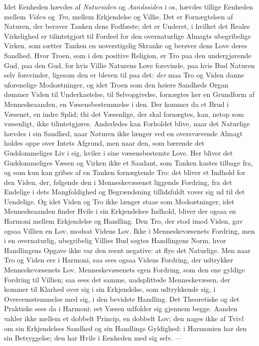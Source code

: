 \documentclass[12pt,a4paper,openany]{book}
\newcommand{\opage}[1]{\marginnote{\footnotesize\textit{[#1]}}}
\begin{document}
Idet Eenheden hævdes af \emph{Natursiden} og \emph{Aandssiden}
i os, hævdes tillige Eenheden mellem \emph{Viden} og \emph{Tro},
mellem Erkjendelse og Villie. Det er Fornægtelsen af Naturen,
der berøver Tanken dens Fodfæste; det er Underet, i hvilket
det Reales Virkelighed er tilintetgjort til Fordeel for den
overnaturlige Almagts ubegribelige Virken, som sætter Tanken
en uoverstigelig Skranke og berøver dens Love deres Sandhed.
Hvor Troen, som i den positive Religion, er Tro paa den
undergjørende Gud, paa den Gud, for hvis Villie Naturens
Love forsvinde, paa hvis Bud Naturen selv forsvinder, ligesom
den er bleven til paa det: \emph{der} maa Tro og Viden danne
uforenelige Modsætninger, og idet Troen som den høiere
Sandheds Organ dømmer Viden til Underkastelse, til Selvopgivelse,
fornægtes her en Grundform af Menneskeaanden,
en Væsensbestemmelse i den. Der kommer da et Brud i
Væsenet, en indre Splid; thi det Væsenlige, der skal fornægtes,
kan, netop som væsenligt, ikke tilintetgjøres. Anderledes
kan Forholdet blive, naar det Naturlige hævdes i sin
Sandhed, naar Naturen ikke længer ved en oversvævende
Almagt holdes oppe over Intets Afgrund, men naar den,
\opage{495}som bærende det Guddommeliges Liv i sig, hviler i sine
væsensbestemte Love. Her bliver det Guddommeliges Væsen
og Virken ikke et Saadant, som Tanken kastes tilbage fra,
og som kun kan gribes af en Tanken fornægtende Tro: det
bliver et Indhold for den Viden, der, følgende den i Menneskevæsenet
liggende Fordring, fra det Endelige i dets Mangfoldighed
og Begrændsning tillidsfuldt vover sig ud til det
Uendelige. Og idet Viden og Tro ikke længer staae som
Modsætninger, idet Menneskeaanden finder Hvile i sin Erkjendelses
Indhold, bliver der ogsaa en Harmoni mellem Erkjendelse
og Handling. Den Tro, der stod imod Viden, gav
ogsaa Villien en Lov, modsat Videns Lov. Ikke i Menneskevæsenets
Fordring, men i en overnaturlig, ubegribelig Villies
Bud søgtes Handlingens Norm, hvor Handlingens Opgave
ikke var den reent negative: at flye det Naturlige. Men naar
Tro og Viden ere i Harmoni, saa sees ogsaa Videns Fordring,
der udtrykker Menneskevæsenets Lov, Menneskevæsenets
egen Fordring, som den ene gyldige Fordring til Villien;
saa sees det samme, uadsplittede Menneskevæsen, der kommer
til Klarhed over sig i sin Erkjendelse, som udtrykkende sig, i
Overeensstemmelse med sig, i den bevidste Handling. Det
Theoretiske og det Praktiske sees da i Harmoni: eet Væsen
udfolder sig gjennem begge. Aanden vakler ikke mellem et
dobbelt Princip, en dobbelt Lov; den nages ikke af Tvivl
om sin Erkjendelses Sandhed og sin Handlings Gyldighed:
i Harmonien har den sin Betryggelse; den har Hvile i Eenheden
med sig selv. ---
\end{document}
